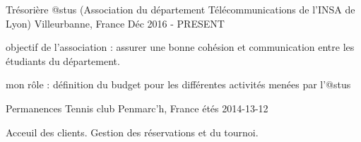 

\begin{cventries}

  \cventry
    {Trésorière} %
    {@stus (Association du département Télécommunications de l'INSA de Lyon)}  %
    {Villeurbanne, France} %
    {Déc 2016 - PRESENT} %
    {
      \begin{cvitems} %
        \item {objectif de l'association : assurer une bonne cohésion et communication entre les étudiants du département.}
        \item {mon rôle : définition du budget pour les différentes activités menées par l'@stus}
      \end{cvitems}
    }

  \cventry
    {Permanences} %
    {Tennis club} %
    {Penmarc'h, France} %
    {étés 2014-13-12} %
    {
      \begin{cvitems} %
        \item {Acceuil des clients. Gestion des réservations et du tournoi.}
      \end{cvitems}
    }


\end{cventries}
